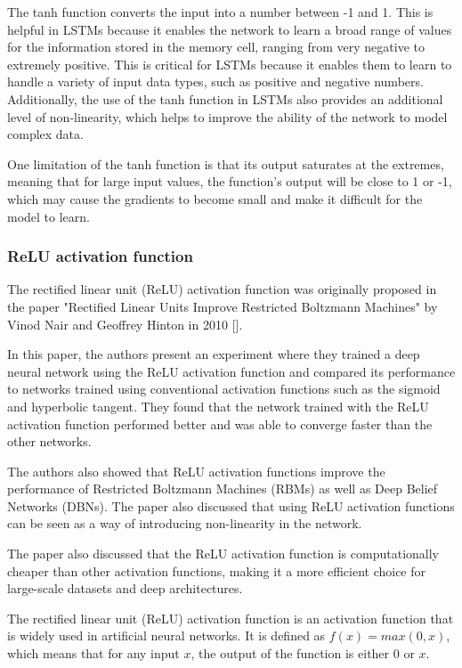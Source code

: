 \documentclass[a4paper]{article}
\begin{document}
The tanh function converts the input into a number between -1 and 1. This is helpful in LSTMs because it enables the network to learn a broad range of values for the information stored in the memory cell, ranging from very negative to extremely positive. This is critical for LSTMs because it enables them to learn to handle a variety of input data types, such as positive and negative numbers. Additionally, the use of the tanh function in LSTMs also provides an additional level of non-linearity, which helps to improve the ability of the network to model complex data.

One limitation of the tanh function is that its output saturates at the extremes, meaning that for large input values, the function's output will be close to 1 or -1, which may cause the gradients to become small and make it difficult for the model to learn.
\subsubsection{ReLU activation function} \label{relu}

The rectified linear unit (ReLU) activation function was originally proposed in the paper "Rectified Linear Units Improve Restricted Boltzmann Machines" by Vinod Nair and Geoffrey Hinton in 2010 [\cite{nair2010rectified}].

In this paper, the authors present an experiment where they trained a deep neural network using the ReLU activation function and compared its performance to networks trained using conventional activation functions such as the sigmoid and hyperbolic tangent. They found that the network trained with the ReLU activation function performed better and was able to converge faster than the other networks.

The authors also showed that ReLU activation functions improve the performance of Restricted Boltzmann Machines (RBMs) as well as Deep Belief Networks (DBNs). The paper also discussed that using ReLU activation functions can be seen as a way of introducing non-linearity in the network.

The paper also discussed that the ReLU activation function is computationally cheaper than other activation functions, making it a more efficient choice for large-scale datasets and deep architectures.

The rectified linear unit (ReLU) activation function is an activation function that is widely used in artificial neural networks. It is defined as $f(x) = max(0,x)$, which means that for any input $x$, the output of the function is either 0 or $x$.
\end{document}

